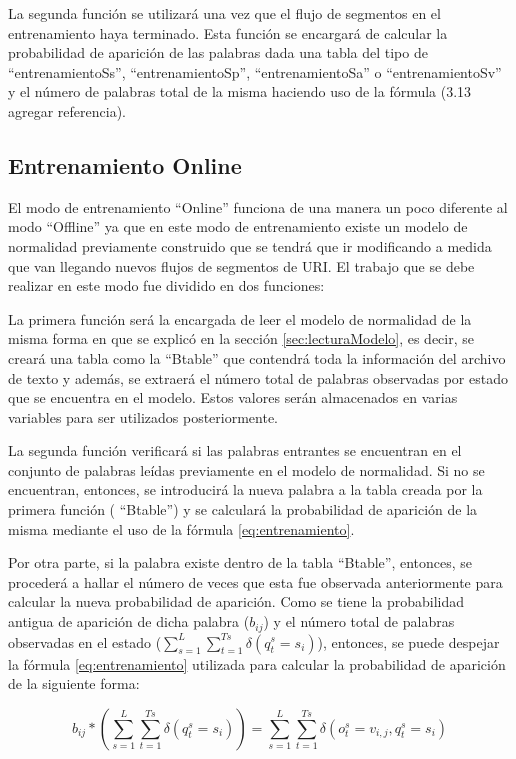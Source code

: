 La segunda función se utilizará una vez que el flujo de segmentos en el entrenamiento haya terminado. Esta función se encargará de calcular la probabilidad de aparición de las palabras dada una tabla del tipo de “entrenamientoSs”, “entrenamientoSp”, “entrenamientoSa” o “entrenamientoSv” y el número de palabras total de la misma haciendo uso de la fórmula (3.13 agregar referencia).

\subsection{Entrenamiento Online}\label{sec:entrenamientoOffline}

El modo de entrenamiento “Online” funciona de una manera un poco diferente al modo “Offline” ya que en este modo de entrenamiento existe un modelo de normalidad previamente construido que se tendrá que ir modificando a medida que van llegando nuevos flujos de segmentos de URI. El trabajo que se debe realizar en este modo fue dividido en dos funciones:

La primera función será la encargada de leer el modelo de normalidad de la misma forma en que se explicó en la sección \ref{sec:lecturaModelo}, es decir, se creará una tabla como la “Btable” que contendrá toda la información del archivo de texto y además, se extraerá  el número total de palabras observadas por estado que se encuentra en el modelo. Estos valores serán almacenados en varias variables para ser utilizados posteriormente.

La segunda función verificará si las palabras entrantes se encuentran en el conjunto de palabras leídas previamente en el modelo de normalidad. Si no se encuentran, entonces, se introducirá la nueva palabra a la tabla creada por la primera función ( “Btable”) y se calculará la probabilidad de aparición de la misma mediante el uso de la fórmula \ref{eq:entrenamiento}. 

Por otra parte, si la palabra existe dentro de la tabla “Btable”, entonces, se procederá a hallar el número de veces que esta fue observada anteriormente para calcular la nueva probabilidad de aparición. Como se tiene la probabilidad antigua de aparición de dicha palabra ($b_{ij}$) y el número total de palabras observadas en el estado ($\sum_{s=1}^{L}\sum_{t=1}^{Ts}\delta(q_{t}^{s} = s_{i})$), entonces, se puede despejar la fórmula \ref{eq:entrenamiento} utilizada para calcular la probabilidad de aparición de la siguiente forma:

\begin{equation}\label{eq:probAparicion}
b_{ij}*(\sum_{s=1}^{L}\sum_{t=1}^{Ts}\delta(q_{t}^{s} = s_{i}) ) = \sum_{s=1}^{L}\sum_{t=1}^{Ts}\delta(o_{t}^{s} = v_{i,j} ,q_{t}^{s} = s_{i} )      
\end{equation}

